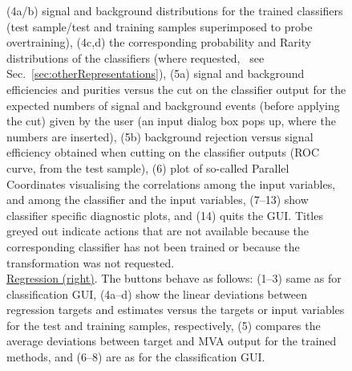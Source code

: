 \begin{figure}[p]
{{              (4a/b) signal and background distributions for the trained classifiers (test
              sample/test and training samples superimposed to probe overtraining),
              (4c,d) the corresponding probability and Rarity distributions of the classifiers
              (where requested, \cf\  see Sec.~\ref{sec:otherRepresentations}),
              (5a) signal and background efficiencies and purities versus the cut on the classifier
              output for the expected numbers of signal and background events (before applying the cut)
              given by the user (an input dialog box pops up, where the numbers are inserted),
              (5b) background rejection versus signal efficiency obtained when cutting
              on the classifier outputs (ROC curve, from the test sample), (6) plot of so-called
              Parallel Coordinates visualising the correlations among the input variables, and
              among the classifier and the input variables,  (7--13) show classifier
              specific diagnostic plots, and (14) quits the GUI. Titles greyed out indicate
              actions that are not available because the corresponding classifier has not
              been trained or because the transformation was not requested.\\
              \underline{Regression (right)}. The buttons behave as follows:
              (1--3) same as for classification GUI, (4a--d) show the linear deviations between
              regression targets and estimates versus the targets or input variables for the
              test and training samples, respectively, (5) compares the average deviations
              between target and MVA output for the trained methods, and (6--8) are as for the classification GUI.}
}
\label{fig:tmvagui}
\end{figure}

